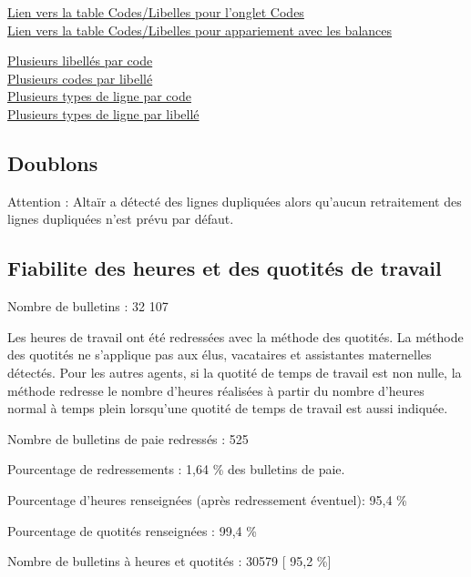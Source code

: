 \href{../Bases/Fiabilite/code.libelle.short.csv}{Lien vers la table
Codes/Libelles pour l'onglet Codes}\\
\href{../Bases/Fiabilite/code.libelle.csv}{Lien vers la table
Codes/Libelles pour appariement avec les balances}

\href{../Bases/Fiabilite/plusieurs_libelles_par_code.csv}{Plusieurs
libellés par code}\\
\href{../Bases/Fiabilite/plusieurs_codes_par_libelle.csv}{Plusieurs codes
par libellé}\\
\href{../Bases/Fiabilite/plusieurs_types_par_code.csv}{Plusieurs types de
ligne par code}\\
\href{../Bases/Fiabilite/plusieurs_types_par_libelle.csv}{Plusieurs types
de ligne par libellé}

\hypertarget{doublons}{%
\subsection{Doublons}\label{doublons}}

Attention : Altaïr a détecté des lignes dupliquées alors qu'aucun
retraitement des lignes dupliquées n'est prévu par défaut.

\hypertarget{fiabilite-des-heures-et-des-quotites-de-travail}{%
\subsection{Fiabilite des heures et des quotités de
travail}\label{fiabilite-des-heures-et-des-quotites-de-travail}}

Nombre de bulletins : 32 107

Les heures de travail ont été redressées avec la méthode des quotités.
La méthode des quotités ne s'applique pas aux élus, vacataires et
assistantes maternelles détectés. Pour les autres agents, si la quotité
de temps de travail est non nulle, la méthode redresse le nombre
d'heures réalisées à partir du nombre d'heures normal à temps plein
lorsqu'une quotité de temps de travail est aussi indiquée.

Nombre de bulletins de paie redressés : 525

Pourcentage de redressements : 1,64 \% des bulletins de paie.

Pourcentage d'heures renseignées (après redressement éventuel): 95,4 \%

Pourcentage de quotités renseignées : 99,4 \%

Nombre de bulletins à heures et quotités : 30579 {[} 95,2 \%{]}


